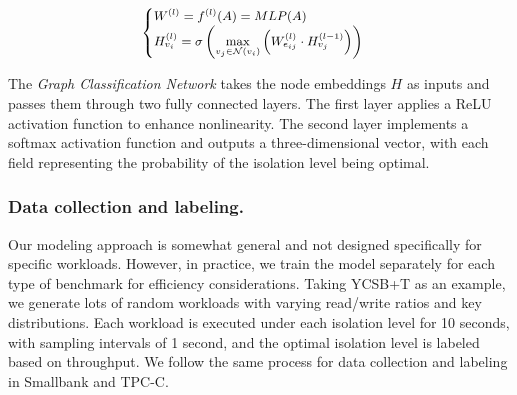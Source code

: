 \begin{equation}
    \small
    \begin{cases}
    W^{(l)} = f^{(l)}(A) = MLP(A) \\
    H^{(l)}_{v_i} = \sigma \left( \underset{v_j \in \mathcal{N}(v_i)}{\max} \left( W^{(l)}_{e_{ij}} \cdot H_{v_j}^{(l-1)} \right) \right)
    \end{cases}
    \label{eq: gnn}
\end{equation} 

The \textit{Graph Classification Network} takes the node embeddings $H$ as inputs and passes them through two fully connected layers. The first layer applies a ReLU activation function to enhance nonlinearity. The second layer implements a softmax activation function and outputs a three-dimensional vector, with each field representing the probability of the isolation level being optimal.


\subsubsection{Data collection and labeling. } Our modeling approach is somewhat general and not designed specifically for specific workloads. However, in practice, we train the model separately for each type of benchmark for efficiency considerations. Taking YCSB+T as an example, we generate lots of random workloads with varying read/write ratios and key distributions. 
Each workload is executed under each isolation level for 10 seconds, with sampling intervals of 1 second, and the optimal isolation level is labeled based on throughput. 
We follow the same process for data collection and labeling in Smallbank and TPC-C. 


